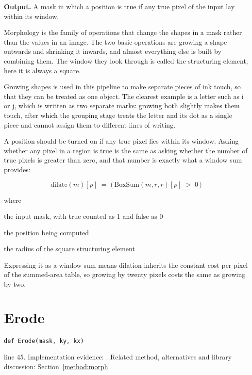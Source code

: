 \noindent\textbf{Output.} A mask in which a position is true if any true pixel of the input lay within its window.


Morphology is the family of operations that change the shapes in a mask rather than the values in an image. The two basic operations are growing a shape outwards and shrinking it inwards, and almost everything else is built by combining them. The window they look through is called the structuring element; here it is always a square.


Growing shapes is used in this pipeline to make separate pieces of ink touch, so that they can be treated as one object. The clearest example is a letter such as i or j, which is written as two separate marks: growing both slightly makes them touch, after which the grouping stage treats the letter and its dot as a single piece and cannot assign them to different lines of writing.


A position should be turned on if any true pixel lies within its window. Asking whether any pixel in a region is true is the same as asking whether the number of true pixels is greater than zero, and that number is exactly what a window sum provides:


\begin{equation}
\mathrm{dilate}(m)[p] \;=\; \big(\,\mathrm{BoxSum}(m,r,r)[p] \;>\; 0 \,\big)
\end{equation}

\noindent where
\begin{description}[leftmargin=2.4em,style=nextline,font=\normalfont\ttfamily]\setlength\itemsep{1pt}
  \item[{$m$}] \normalfont the input mask, with true counted as 1 and false as 0
  \item[{$p$}] \normalfont the position being computed
  \item[{$r$}] \normalfont the radius of the square structuring element
\end{description}
Expressing it as a window sum means dilation inherits the constant cost per pixel of the summed-area table, so growing by twenty pixels costs the same as growing by two.



\section{Erode}\label{fn:segment:Erode}
\begin{lstlisting}[style=sig]
def Erode(mask, ky, kx)
\end{lstlisting}
 line 45. Implementation evidence: \cite{code2026}. Related method, alternatives and library discussion: Section~\ref{method:morph}.


